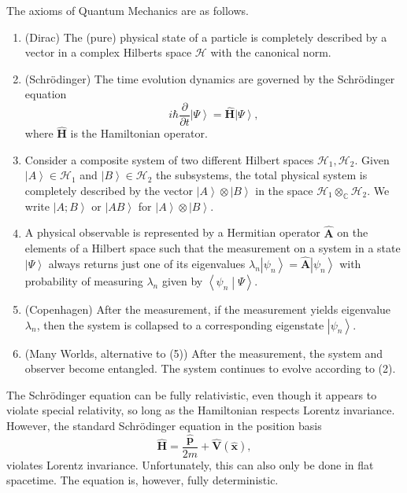 
The axioms of Quantum Mechanics are as follows.


\begin{enumerate}
	\item (Dirac) The (pure) physical state of a particle is completely described by a vector in a complex Hilberts space $\mathcal{H} $ with the canonical norm.
	\item (Schr\"odinger) The time evolution dynamics are governed by the Schr\"odinger equation
		\[
			i\hbar \frac{\partial }{\partial t} \left|\Psi \right\rangle = \mathbf{\hat{H} } \left|\Psi \right\rangle, 
		\]
		where $\mathbf{\hat{H} } $ is the Hamiltonian operator.
	\item Consider a composite system of two different Hilbert spaces $\mathcal{H} _1,\mathcal{H} _2$. Given $\left|A\right\rangle\in \mathcal{H} _1$ and $\left|B\right\rangle\in \mathcal{H} _2$ the subsystems, the total physical system is completely described by the vector $\left|A\right\rangle\otimes \left|B\right\rangle$ in the space $\mathcal{H} _1\otimes_\mathbb{C} \mathcal{H} _2$. We write $\left|A;B\right\rangle$ or $\left|AB\right\rangle$ for $\left|A\right\rangle\otimes \left|B\right\rangle$.
	\item A physical observable is represented by a Hermitian operator $\mathbf{\hat{A} } $ on the elements of a Hilbert space such that the measurement on a system in a state $\left|\Psi \right\rangle$ always returns just one of its eigenvalues $\lambda _n\left|\psi _n\right\rangle = \mathbf{\hat{A} }  \left|\psi _n\right\rangle$ with probability of measuring $\lambda _n$ given by $\left\langle \psi _n\middle\vert\Psi \right\rangle$.
	\item (Copenhagen) After the measurement, if the measurement yields eigenvalue $\lambda _n$, then the system is collapsed to a corresponding eigenstate $\left|\psi _n\right\rangle$.
	\item (Many Worlds, alternative to (5)) After the measurement, the system and observer become entangled. The system continues to evolve according to (2).
\end{enumerate}

\begin{remark}
	The Schr\"odinger equation can be fully relativistic, even though it appears to violate special relativity, so long as the Hamiltonian respects Lorentz invariance. However, the standard Schr\"odinger equation in the position basis
	\[
		\mathbf{\hat{H} } =\frac{\mathbf{\hat{p} } }{2m} +\mathbf{\hat{V} }(\mathbf{\hat{x} })  
	,\]
	violates Lorentz invariance. Unfortunately, this can also only be done in flat spacetime. The equation is, however, fully deterministic.
\end{remark}
